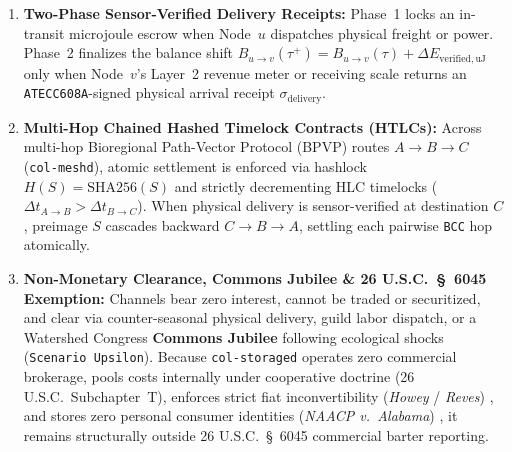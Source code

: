 \begin{enumerate}
    \item \textbf{Two-Phase Sensor-Verified Delivery Receipts:} Phase~1 locks an in-transit microjoule escrow when Node~$u$ dispatches physical freight or power. Phase~2 finalizes the balance shift $B_{u \to v}(\tau^+) = B_{u \to v}(\tau) + \Delta E_{\mathrm{verified},\mathrm{uJ}}$ only when Node~$v$'s Layer~2 revenue meter or receiving scale returns an \texttt{ATECC608A}-signed physical arrival receipt $\sigma_{\mathrm{delivery}}$.
    \item \textbf{Multi-Hop Chained Hashed Timelock Contracts (HTLCs):} Across multi-hop Bioregional Path-Vector Protocol (BPVP) routes $A \to B \to C$ (\texttt{col-meshd}), atomic settlement is enforced via hashlock $H(S) = \mathrm{SHA256}(S)$ and strictly decrementing HLC timelocks ($\Delta t_{A \to B} > \Delta t_{B \to C}$). When physical delivery is sensor-verified at destination $C$, preimage $S$ cascades backward $C \to B \to A$, settling each pairwise \texttt{BCC} hop atomically.
    \item \textbf{Non-Monetary Clearance, Commons Jubilee \& 26 U.S.C.\ \S~6045 Exemption:} Channels bear zero interest, cannot be traded or securitized, and clear via counter-seasonal physical delivery, guild labor dispatch, or a Watershed Congress \textbf{Commons Jubilee} following ecological shocks (\texttt{Scenario Upsilon}). Because \texttt{col-storaged} operates zero commercial brokerage, pools costs internally under cooperative doctrine (26 U.S.C.\ Subchapter~T), enforces strict fiat inconvertibility (\textit{Howey} / \textit{Reves}) \parencite{howey1946,reves1990}, and stores zero personal consumer identities (\textit{NAACP v.\ Alabama}) \parencite{naacp1958}, it remains structurally outside 26 U.S.C.\ \S~6045 commercial barter reporting.
\end{enumerate}


